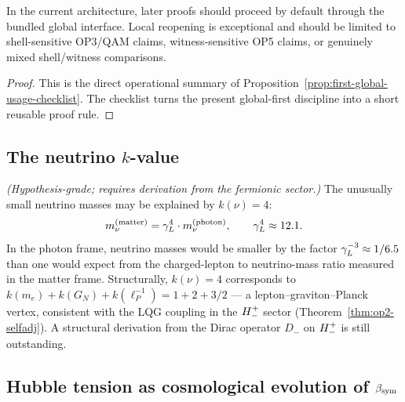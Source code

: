 \begin{corollary}
\label{cor:practical-default-rule-global-first-local-only-if-needed}
In the current architecture, later proofs should proceed by default through the bundled global interface. Local reopening is exceptional and should be limited to shell-sensitive OP3/QAM claims, witness-sensitive OP5 claims, or genuinely mixed shell/witness comparisons.
\end{corollary}

\begin{proof}
This is the direct operational summary of Proposition~\ref{prop:first-global-usage-checklist}. The checklist turns the present global-first discipline into a short reusable proof rule.
\end{proof}


\subsection{The neutrino $k$-value}

\begin{proposition}[$k(\nu) = 4$ as hypothesis, hypothesis-grade]
\label{prop:k-neutrino}
\emph{(Hypothesis-grade; requires derivation from the fermionic sector.)}
The unusually small neutrino masses may be explained by $k(\nu) = 4$:
\[
  m_\nu^{(\mathrm{matter})} = \gamma_L^4 \cdot m_\nu^{(\mathrm{photon})},
  \qquad \gamma_L^4 \approx 12.1.
\]
In the photon frame, neutrino masses would be smaller by the factor
$\gamma_L^{-3} \approx 1/6.5$ than one would expect from the charged-lepton to
neutrino-mass ratio measured in the matter frame.
Structurally, $k(\nu) = 4$ corresponds to
$k(m_e)+k(G_N)+k(\ell_P^{-1}) = 1+2+3/2$ --- a lepton--graviton--Planck
vertex, consistent with the LQG coupling in the $H^+_-$ sector
(Theorem~\ref{thm:op2-selfadj}).
A structural derivation from the Dirac operator $D_-$ on $H^+_-$
is still outstanding.
\end{proposition}

\subsection{Hubble tension as cosmological evolution of $\beta_{\mathrm{sym}}$}

